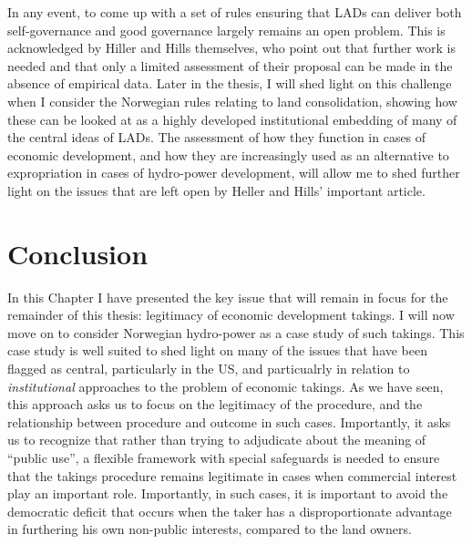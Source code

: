 In any event, to come up with a set of rules ensuring that LADs can deliver both self-governance and good governance largely remains an open problem. This is acknowledged by Hiller and Hills themselves, who point out that further work is needed and that only a limited assessment of their proposal can be made in the absence of empirical data. Later in the thesis, I will shed light on this challenge when I consider the Norwegian rules relating to land consolidation, showing how these can be looked at as a highly developed institutional embedding of many of the central ideas of LADs. The assessment of how they function in cases of economic development, and how they are increasingly used as an alternative to expropriation in cases of hydro-power development, will allow me to shed further light on the issues that are left open by Heller and Hills' important article.

\section{Conclusion}

In this Chapter I have presented the key issue that will remain in focus for the remainder of this thesis: legitimacy of economic development takings. I will now move on to consider Norwegian hydro-power as a case study of such takings. This case study is well suited to shed light on many of the issues that have been flagged as central, particularly in the US, and particualrly in relation to {\it institutional} approaches to the problem of economic takings. As we have seen, this approach asks us to focus on the legitimacy of the procedure, and the relationship between procedure and outcome in such cases. Importantly, it asks us to recognize that rather than trying to adjudicate about the meaning of ``public use'', a flexible framework with special safeguards is needed to ensure that the takings procedure remains legitimate in cases when commercial interest play an important role. Importantly, in such cases, it is important to avoid the democratic deficit that occurs when the taker has a disproportionate advantage in furthering his own non-public interests, compared to the land owners. 

